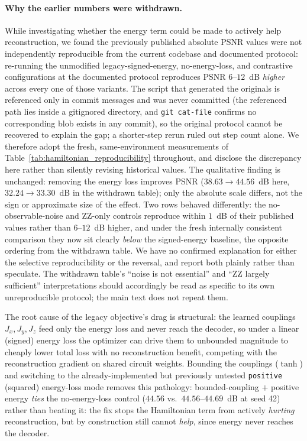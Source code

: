\documentclass[11pt]{article}
\begin{document}
\paragraph{Why the earlier numbers were withdrawn.}\label{sec:hamiltonian_followup} While investigating whether the energy term could be made to actively help reconstruction, we found the previously published absolute PSNR values were not independently reproducible from the current codebase and documented protocol: re-running the unmodified legacy-signed-energy, no-energy-loss, and contrastive configurations at the documented protocol reproduces PSNR $6$--$12$~dB \emph{higher} across every one of those variants. The script that generated the originals is referenced only in commit messages and was never committed (the referenced path lies inside a gitignored directory, and \texttt{git cat-file} confirms no corresponding blob exists in any commit), so the original protocol cannot be recovered to explain the gap; a shorter-step rerun ruled out step count alone. We therefore adopt the fresh, same-environment measurements of Table~\ref{tab:hamiltonian_reproducibility} throughout, and disclose the discrepancy here rather than silently revising historical values. The qualitative finding is unchanged: removing the energy loss improves PSNR ($38.63\rightarrow44.56$~dB here, $32.24\rightarrow33.30$~dB in the withdrawn table); only the absolute scale differs, not the sign or approximate size of the effect. Two rows behaved differently: the no-observable-noise and ZZ-only controls reproduce within $1$~dB of their published values rather than $6$--$12$~dB higher, and under the fresh internally consistent comparison they now sit clearly \emph{below} the signed-energy baseline, the opposite ordering from the withdrawn table. We have no confirmed explanation for either the selective reproducibility or the reversal, and report both plainly rather than speculate. The withdrawn table's ``noise is not essential'' and ``ZZ largely sufficient'' interpretations should accordingly be read as specific to its own unreproducible protocol; the main text does not repeat them.

The root cause of the legacy objective's drag is structural: the learned couplings $J_x,J_y,J_z$ feed only the energy loss and never reach the decoder, so under a linear (signed) energy loss the optimizer can drive them to unbounded magnitude to cheaply lower total loss with no reconstruction benefit, competing with the reconstruction gradient on shared circuit weights. Bounding the couplings ($\tanh$) and switching to the already-implemented but previously untested \texttt{positive} (squared) energy-loss mode removes this pathology: bounded-coupling $+$ positive energy \emph{ties} the no-energy-loss control ($44.56$ vs.\ $44.56$--$44.69$~dB at seed 42) rather than beating it: the fix stops the Hamiltonian term from actively \emph{hurting} reconstruction, but by construction still cannot \emph{help}, since energy never reaches the decoder.
\end{document}
